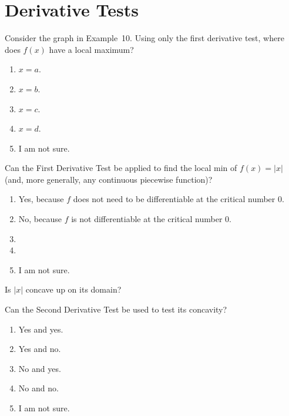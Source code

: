 \documentclass[14pt]{beamer}
\begin{document}
\section{Derivative Tests}

\begin{frame}[t]
  Consider the graph in Example~10. Using only the first derivative test, where does \(f(x)\) have a local maximum? 

  \medskip
  \begin{enumerate} \setlength\itemsep{1ex}
    \item \(x = a\). 
    \item \(x = b\). 
    \item \(x = c\).
    \item \(x = d\). 
    \item I am not sure.
  \end{enumerate} 
\end{frame}

\begin{frame}[t]
  Can the First Derivative Test be applied to find the local min of \(f(x) = |x|\) (and, more generally, any continuous piecewise function)? 

  \medskip
  \begin{enumerate} \setlength\itemsep{1ex}
    \item Yes, because \(f\) does not need to be differentiable at the critical number \(0\).
    \item No, because \(f\) is not differentiable at the critical number \(0\).
    \item 
    \item 
    \item I am not sure.
  \end{enumerate} 
\end{frame}

\begin{frame}[t]
  Is \(|x|\) concave up on its domain? 

  Can the Second Derivative Test be used to test its concavity?

  \medskip
  \begin{enumerate} \setlength\itemsep{1ex}
    \item Yes and yes.
    \item Yes and no.
    \item No and yes.
    \item No and no.
    \item I am not sure.
  \end{enumerate} 
\end{frame}
\end{document}

